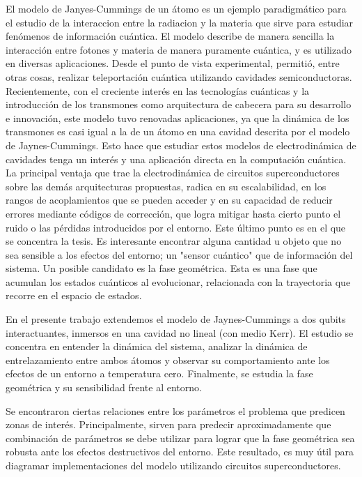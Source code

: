 \newenvironment{abstract}%
{\thispagestyle{empty} \cleardoublepage\null \thispagestyle{empty} \vfill\begin{center}
\bfseries \abstractname \end{center} }%
{\thispagestyle{empty} \vfill\null }


\begin{abstract}
El modelo de Janyes-Cummings de un \'atomo es un ejemplo paradigm\'atico para el estudio de la interaccion entre la radiacion y la materia que sirve para estudiar fenómenos de  informaci\'on cu\'antica. El modelo describe de 
manera sencilla la interacci\'on entre fotones y materia de manera puramente cu\'antica, y es utilizado en diversas aplicaciones. Desde el punto de vista experimental, permitió, entre otras cosas, realizar teleportación cuántica utilizando cavidades semiconductoras. Recientemente, con el creciente interés en las tecnologías cuánticas y la introducción de los transmones como arquitectura de cabecera para su desarrollo e innovación, este modelo tuvo renovadas aplicaciones, ya que la dinámica de los transmones es casi igual a la de un átomo en una cavidad descrita por el modelo de Jaynes-Cummings. Esto hace que estudiar estos modelos de electrodinámica de cavidades tenga un interés y una aplicación directa en la computación cuántica. 
La principal ventaja que trae la electrodinámica de circuitos superconductores sobre las demás arquitecturas  propuestas, radica en su escalabilidad, en los rangos de acoplamientos que se pueden acceder y en su capacidad de reducir errores mediante códigos de corrección, que logra mitigar hasta cierto punto el ruido o las pérdidas introducidos por el entorno. Este último punto es en el que se concentra la tesis.
Es interesante encontrar alguna cantidad u objeto que no sea sensible a los efectos del entorno; un "sensor cuántico" que de información del sistema. Un posible candidato es la fase geométrica. Esta es una fase que acumulan los estados cuánticos al evolucionar, relacionada con la trayectoria que recorre en el espacio de estados. 

En el presente trabajo extendemos el modelo de Jaynes-Cummings a dos qubits interactuantes, inmersos en una cavidad no lineal (con medio Kerr). El estudio se concentra en entender la dinámica del sistema, analizar la dinámica de entrelazamiento entre ambos átomos y observar su comportamiento ante los efectos de un entorno a temperatura cero. Finalmente, se estudia la fase geométrica y su sensibilidad frente al entorno. 

Se encontraron ciertas relaciones entre los parámetros el problema que predicen zonas de interés. Principalmente, sirven para predecir aproximadamente que combinación de parámetros se debe utilizar para lograr que la fase geométrica sea robusta ante los efectos destructivos del entorno. Este resultado, es  muy útil para diagramar implementaciones del modelo utilizando circuitos superconductores. 


\end{abstract}







